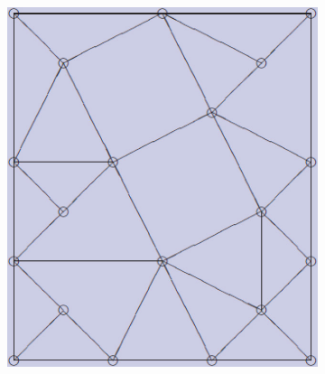 \documentclass[12pt]{article}
\begin{document}
\begin{figure}[tb]
\begin{subfigure}[b]{0.2\textwidth}
      \caption{}\label{fig:contract_kernel4}
  \end{subfigure}

  \begin{subfigure}[b]{0.2\textwidth}
      \includegraphics[width=\textwidth]{img/contract_kernel5}
      \caption{}\label{fig:contract_kernel5}
  \end{subfigure}
  ~
  \begin{subfigure}[b]{0.2\textwidth}

\end{subfigure}
\end{figure}
\end{document}
